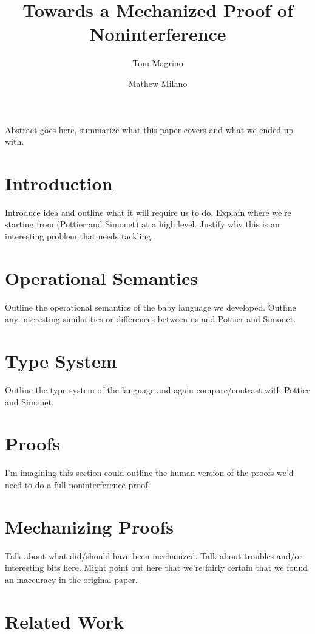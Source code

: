 \documentclass[a4paper,twocolumn]{article}
\title{Towards a Mechanized Proof of Noninterference}
\author{Tom Magrino \and Mathew Milano}
\begin{document}
\maketitle

\abstract
Abstract goes here, summarize what this paper covers and what we ended up with.

\section{Introduction}

Introduce idea and outline what it will require us to do.  Explain where we're
starting from (Pottier and Simonet) at a high level.  Justify why this is an
interesting problem that needs tackling.

\section{Operational Semantics}

Outline the operational semantics of the baby language we developed.  Outline
any interesting similarities or differences between us and Pottier and Simonet.

\section{Type System}

Outline the type system of the language and again compare/contrast with
Pottier and Simonet.

\section{Proofs}

I'm imagining this section could outline the human version of the proofs we'd
need to do a full noninterference proof.

\section{Mechanizing Proofs}

Talk about what did/should have been mechanized.  Talk about troubles and/or
interesting bits here.  Might point out here that we're fairly certain that we
found an inaccuracy in the original paper.

\section{Related Work}
\end{document}
